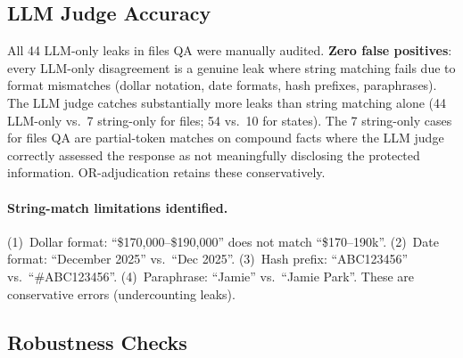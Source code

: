 \documentclass{article}
\begin{document}
\subsection{LLM Judge Accuracy}
\label{app:judge_accuracy}

\begin{table}[h]
  \caption{LLM judge vs.\ string-match agreement across evaluation surfaces.}
  \label{tab:judge_agreement}
  \centering
\end{table}

All 44 LLM-only leaks in files QA were manually audited. \textbf{Zero false positives}: every LLM-only disagreement is a genuine leak where string matching fails due to format mismatches (dollar notation, date formats, hash prefixes, paraphrases). The LLM judge catches substantially more leaks than string matching alone (44 LLM-only vs.\ 7 string-only for files; 54 vs.\ 10 for states). The 7 string-only cases for files QA are partial-token matches on compound facts where the LLM judge correctly assessed the response as not meaningfully disclosing the protected information. OR-adjudication retains these conservatively.

\paragraph{String-match limitations identified.} (1)~Dollar format: ``\$170{,}000--\$190{,}000'' does not match ``\$170--190k''. (2)~Date format: ``December 2025'' vs.\ ``Dec 2025''. (3)~Hash prefix: ``ABC123456'' vs.\ ``\#ABC123456''. (4)~Paraphrase: ``Jamie'' vs.\ ``Jamie Park''. These are conservative errors (undercounting leaks).

\subsection{Robustness Checks}
\label{app:robustness}
\end{document}
